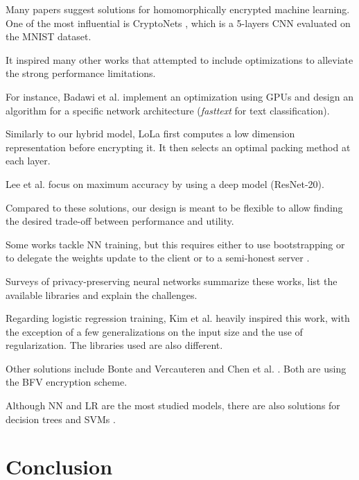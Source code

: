 \documentclass[a4paper,11pt,oneside]{report}
\begin{document}
Many papers suggest solutions for homomorphically encrypted machine learning.
One of the most influential is CryptoNets \cite{dowlin_cryptonets_2016}, which is a 5-layers CNN evaluated on the MNIST dataset.

It inspired many other works that attempted to include optimizations to alleviate the strong performance limitations.

For instance, Badawi et al. \cite{badawi_privft_2019, badawi_towards_2020} implement an optimization using GPUs and design an algorithm for a specific network architecture (\emph{fasttext} for text classification).

Similarly to our hybrid model, LoLa \cite{brutzkus_low_2019} first computes a low dimension representation before encrypting it. It then selects an optimal packing method at each layer.

Lee et al. \cite{lee_privacy-preserving_2021} focus on maximum accuracy by using a deep model (ResNet-20).

Compared to these solutions, our design is meant to be flexible to allow finding the desired trade-off between performance and utility.

Some works tackle NN training, but this requires either to use bootstrapping or to delegate the weights update to the client \cite{mihara_neural_2020} or to a semi-honest server \cite{bellafqira_secure_2018}.

Surveys \cite{pulido-gaytan_privacy-preserving_2021,podschwadt_sok_2022} of privacy-preserving neural networks summarize these works, list the available libraries and explain the challenges.

Regarding logistic regression training, Kim et al. \cite{kim_logistic_2018} heavily inspired this work, with the exception of a few generalizations on the input size and the use of regularization.
The libraries used are also different.

Other solutions include Bonte and Vercauteren \cite{bonte_privacy-preserving_2018} and Chen et al. \cite{chen_logistic_2018}.
Both are using the BFV encryption scheme.

Although NN and LR are the most studied models, there are also solutions for decision trees \cite{akavia_privacy-preserving_2019} and SVMs \cite{park_he-friendly_2020}.


\chapter{Conclusion}
\end{document}
